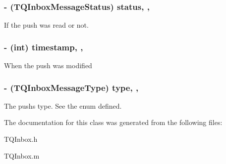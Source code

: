 \subsubsection[{status}]{\setlength{\rightskip}{0pt plus 5cm}-\/ (T\+Q\+Inbox\+Message\+Status) status\hspace{0.3cm}{\ttfamily [read]}, {\ttfamily [atomic]}, {\ttfamily [assign]}}\label{interface_t_q_inbox_message_aef995a499d691cd27c255f59d68ec829}
If the push was read or not. \hypertarget{interface_t_q_inbox_message_abd94ee3e5c563ce6a21fde6354c7337e}{}
\subsubsection[{timestamp}]{\setlength{\rightskip}{0pt plus 5cm}-\/ (int) timestamp\hspace{0.3cm}{\ttfamily [read]}, {\ttfamily [atomic]}, {\ttfamily [assign]}}\label{interface_t_q_inbox_message_abd94ee3e5c563ce6a21fde6354c7337e}
When the push was modified \hypertarget{interface_t_q_inbox_message_a0095078f27cb8ac50a0306b83ef86ddc}{}
\subsubsection[{type}]{\setlength{\rightskip}{0pt plus 5cm}-\/ (T\+Q\+Inbox\+Message\+Type) type\hspace{0.3cm}{\ttfamily [read]}, {\ttfamily [atomic]}, {\ttfamily [assign]}}\label{interface_t_q_inbox_message_a0095078f27cb8ac50a0306b83ef86ddc}
The push\textquotesingle{}s type. See the enum defined. 

The documentation for this class was generated from the following files\+:\begin{DoxyCompactItemize}
\item 
T\+Q\+Inbox.\+h\item 
T\+Q\+Inbox.\+m\end{DoxyCompactItemize}
